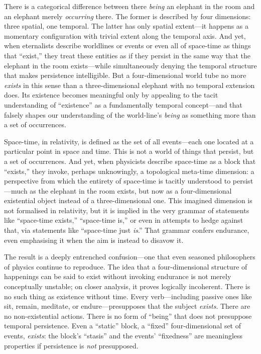 \documentclass[12pt]{book}
\begin{document}
There is a categorical difference between there \textit{being} an elephant in the room and an elephant merely \textit{occurring} there. The former is described by four dimensions: three spatial, one temporal. The latter has only spatial extent---it happens as a momentary configuration with trivial extent along the temporal axis. And yet, when eternalists describe worldlines or events or even all of space-time as things that ``exist,'' they treat these entities as if they persist in the same way that the elephant in the room exists---while simultaneously denying the temporal structure that makes persistence intelligible. But a four-dimensional world tube no more \textit{exists} in this sense than a three-dimensional elephant with no temporal extension does. Its existence becomes meaningful only by appealing to the tacit understanding of ``existence'' as a fundamentally temporal concept---and that falsely shapes our understanding of the world-line's \textit{being} as something more than a set of occurrences.

Space-time, in relativity, is defined as the set of all events---each one located at a particular point in space and time. This is not a world of things that persist, but a set of occurrences. And yet, when physicists describe space-time as a block that ``exists,'' they invoke, perhaps unknowingly, a topological meta-time dimension: a perspective from which the entirety of space-time is tacitly understood to persist---much as the elephant in the room exists, but now as a four-dimensional existential object instead of a three-dimensional one. This imagined dimension is not formalised in relativity, but it is implied in the very grammar of statements like ``space-time exists,'' ``space-time is,'' or even in attempts to hedge against that, via statements like ``space-time just \textit{is}.'' That grammar confers endurance, even emphasising it when the aim is instead to disavow it.

The result is a deeply entrenched confusion---one that even seasoned philosophers of physics continue to reproduce. The idea that a four-dimensional structure of happenings can be said to exist without invoking endurance is not merely conceptually unstable; on closer analysis, it proves logically incoherent. There is no such thing as existence without time. Every verb---including passive ones like sit, remain, meditate, or endure---presupposes that the subject \textit{exists}. There are no non-existential actions. There is no form of ``being'' that does not presuppose temporal persistence. Even a ``static'' block, a ``fixed'' four-dimensional set of events, \textit{exists}: the block's ``stasis'' and the events' ``fixedness'' are meaningless properties if persistence is \textit{not} presupposed.
\end{document}
